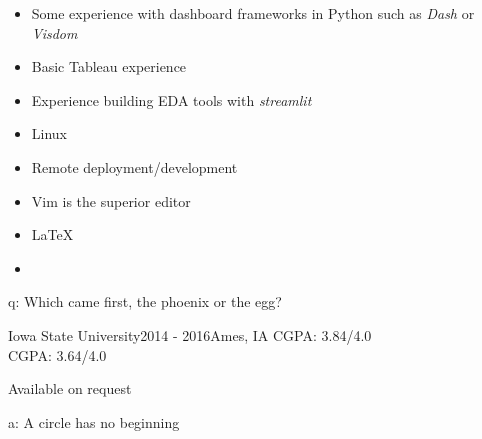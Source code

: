 \documentclass[10pt,a4paper,ragged2e,withhyper]{altacv}
\begin{document}
\begin{paracol}{2}
\begin{itemize}
\item Some experience with dashboard frameworks in Python such as \textit{Dash} or \textit{Visdom}
\item Basic Tableau experience
\item Experience building EDA tools with \textit{streamlit}
\end{itemize}

\begin{itemize}
\item {\faLinux} Linux 
\item Remote deployment/development
\item Vim is the superior editor
\item \LaTeX
\item  {\faGit}
\end{itemize}

\divider

\vspace*{\fill}
\hspace*{\fill}
q: Which came first, the phoenix or the egg?

\newpage

\medskip

 {Iowa State University}{2014 - 2016}{Ames, IA} 
\textsc{CGPA}: 3.84/4.0
\\
\textsc{CGPA}: 3.64/4.0




Available on request




\end{paracol}


\vspace*{\fill}
\hspace*{\fill}
a: A circle has no beginning

\clearpage
\end{document}
